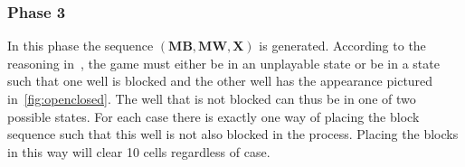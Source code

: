 \subsubsection{Phase 3}
\label{phase3}

In this phase the sequence $\left( \mathbf{MB}, \mathbf{MW}, \mathbf{X} \right)$ is generated. According to the reasoning in~, the game must either be in an unplayable state or be in a state such that one well is blocked and the other well has the appearance pictured in~\autoref{fig:openclosed}. The well that is not blocked can thus be in one of two possible states. For each case there is exactly one way of placing the block sequence such that this well is not also blocked in the process. Placing the blocks in this way will clear 10 cells regardless of case.

